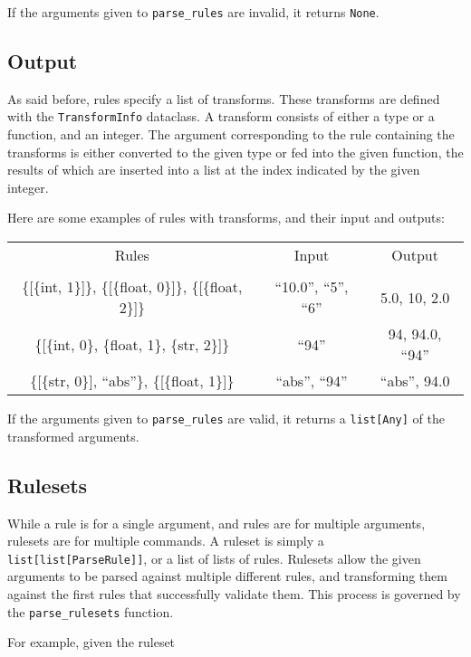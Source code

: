 \documentclass{article}
\begin{document}
				If the arguments given to \verb|parse_rules| are invalid, it returns \verb|None|.

		\subsection{Output}
			As said before, rules specify a list of transforms. These transforms are defined
			with the \verb|TransformInfo| dataclass. A transform consists of either a type or
			a function, and an integer. The argument corresponding to the rule containing the
			transforms is either converted to the given type or fed into the given function,
			the results of which are inserted into a list at the index indicated by the given
			integer.

			Here are some examples of rules with transforms, and their input and outputs:

			\begin{center}
				\begin{tabular}{c c c}
					Rules & Input & Output \\
					\\
						\{[\{int, 1\}]\}, \{[\{float, 0\}]\}, \{[\{float, 2\}]\} &
						``10.0'', ``5'', ``6'' &
						5.0, 10, 2.0
					\\
						\{[\{int, 0\}, \{float, 1\}, \{str, 2\}]\} &
						``94'' &
						94, 94.0, ``94''
					\\
						\{[\{str, 0\}], ``abs''\}, \{[\{float, 1\}]\} &
						``abs'', ``94'' &
						``abs'', 94.0
					\\
				\end{tabular}
			\end{center}

			If the arguments given to \verb|parse_rules| are valid, it returns a \verb|list[Any]|
			of the transformed arguments.

			\subsection{Rulesets}
			While a rule is for a single argument, and rules are for multiple arguments, rulesets
			are for multiple commands. A ruleset is simply a \verb|list[list[ParseRule]]|, or a
			list of lists of rules. Rulesets allow the given arguments to be parsed against
			multiple different rules, and transforming them against the first rules that
			successfully validate them. This process is governed by the \verb|parse_rulesets|
			function.

			For example, given the ruleset
\end{document}
